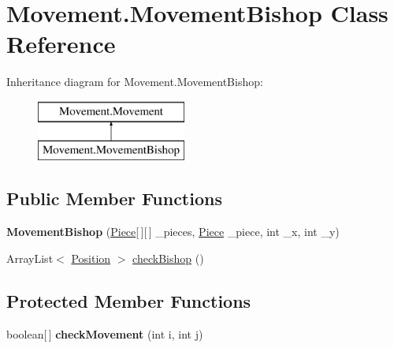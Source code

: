 \hypertarget{class_movement_1_1_movement_bishop}{\section{Movement.\-Movement\-Bishop Class Reference}
\label{class_movement_1_1_movement_bishop}
}
Inheritance diagram for Movement.\-Movement\-Bishop\-:\begin{figure}[H]
\begin{center}
\leavevmode
\includegraphics[height=2.000000cm]{class_movement_1_1_movement_bishop}
\end{center}
\end{figure}
\subsection*{Public Member Functions}
\begin{DoxyCompactItemize}
\item 
\hypertarget{class_movement_1_1_movement_bishop_a783880ac01ad8ed6f877881b2d9d255c}{{\bfseries Movement\-Bishop} (\hyperlink{class_basic___objects_1_1_piece}{Piece}\mbox{[}$\,$\mbox{]}\mbox{[}$\,$\mbox{]} \-\_\-pieces, \hyperlink{class_basic___objects_1_1_piece}{Piece} \-\_\-piece, int \-\_\-x, int \-\_\-y)}\label{class_movement_1_1_movement_bishop_a783880ac01ad8ed6f877881b2d9d255c}

\item 
Array\-List$<$ \hyperlink{class_basic___objects_1_1_position}{Position} $>$ \hyperlink{class_movement_1_1_movement_bishop_a11339825d69b3b9c404644b6ae9200a6}{check\-Bishop} ()
\end{DoxyCompactItemize}
\subsection*{Protected Member Functions}
\begin{DoxyCompactItemize}
\item 
\hypertarget{class_movement_1_1_movement_bishop_a36fde142cd1c4810e2577a744f736687}{boolean\mbox{[}$\,$\mbox{]} {\bfseries check\-Movement} (int i, int j)}\label{class_movement_1_1_movement_bishop_a36fde142cd1c4810e2577a744f736687}

\end{DoxyCompactItemize}


